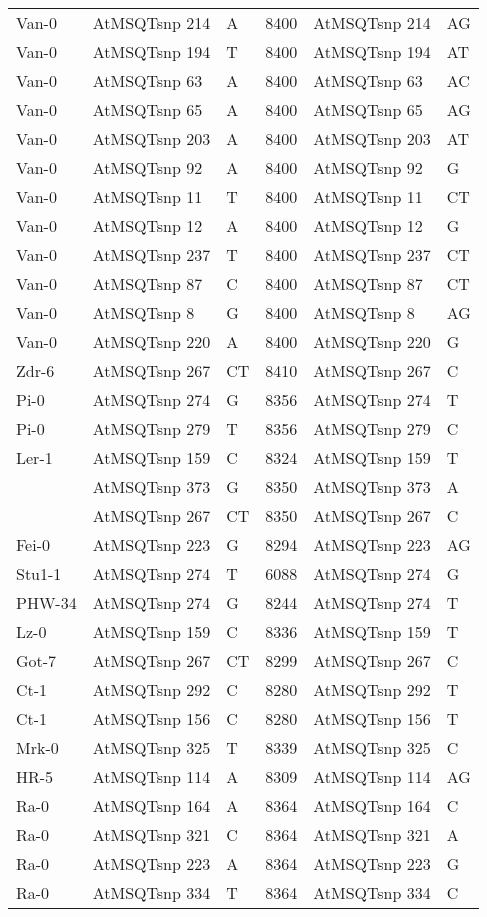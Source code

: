 \begin{center}
\begin{longtable}{|l|l|l|l|l|l|}
Van-0&AtMSQTsnp 214&A&8400&AtMSQTsnp 214&AG\\
Van-0&AtMSQTsnp 194&T&8400&AtMSQTsnp 194&AT\\
Van-0&AtMSQTsnp 63&A&8400&AtMSQTsnp 63&AC\\
Van-0&AtMSQTsnp 65&A&8400&AtMSQTsnp 65&AG\\
Van-0&AtMSQTsnp 203&A&8400&AtMSQTsnp 203&AT\\
Van-0&AtMSQTsnp 92&A&8400&AtMSQTsnp 92&G\\
Van-0&AtMSQTsnp 11&T&8400&AtMSQTsnp 11&CT\\
Van-0&AtMSQTsnp 12&A&8400&AtMSQTsnp 12&G\\
Van-0&AtMSQTsnp 237&T&8400&AtMSQTsnp 237&CT\\
Van-0&AtMSQTsnp 87&C&8400&AtMSQTsnp 87&CT\\
Van-0&AtMSQTsnp 8&G&8400&AtMSQTsnp 8&AG\\
Van-0&AtMSQTsnp 220&A&8400&AtMSQTsnp 220&G\\
Zdr-6&AtMSQTsnp 267&CT&8410&AtMSQTsnp 267&C\\
Pi-0&AtMSQTsnp 274&G&8356&AtMSQTsnp 274&T\\
Pi-0&AtMSQTsnp 279&T&8356&AtMSQTsnp 279&C\\
Ler-1&AtMSQTsnp 159&C&8324&AtMSQTsnp 159&T\\
&AtMSQTsnp 373&G&8350&AtMSQTsnp 373&A\\
&AtMSQTsnp 267&CT&8350&AtMSQTsnp 267&C\\
Fei-0&AtMSQTsnp 223&G&8294&AtMSQTsnp 223&AG\\
Stu1-1&AtMSQTsnp 274&T&6088&AtMSQTsnp 274&G\\
PHW-34&AtMSQTsnp 274&G&8244&AtMSQTsnp 274&T\\
Lz-0&AtMSQTsnp 159&C&8336&AtMSQTsnp 159&T\\
Got-7&AtMSQTsnp 267&CT&8299&AtMSQTsnp 267&C\\
Ct-1&AtMSQTsnp 292&C&8280&AtMSQTsnp 292&T\\
Ct-1&AtMSQTsnp 156&C&8280&AtMSQTsnp 156&T\\
Mrk-0&AtMSQTsnp 325&T&8339&AtMSQTsnp 325&C\\
HR-5&AtMSQTsnp 114&A&8309&AtMSQTsnp 114&AG\\
Ra-0&AtMSQTsnp 164&A&8364&AtMSQTsnp 164&C\\
Ra-0&AtMSQTsnp 321&C&8364&AtMSQTsnp 321&A\\
Ra-0&AtMSQTsnp 223&A&8364&AtMSQTsnp 223&G\\
Ra-0&AtMSQTsnp 334&T&8364&AtMSQTsnp 334&C\\

\end{longtable}
\end{center}

